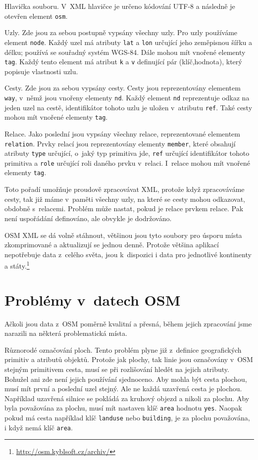 {\tuc Hlavička souboru.} V~XML hlavičce je určeno kódování UTF-8 a následně je
otevřen element \verb|osm|. 

{\tuc Uzly.} Zde jsou za sebou postupně vypsány všechny uzly.  Pro uzly
používáme element \verb|node|. Každý uzel má atributy \verb|lat| a \verb|lon|
určující jeho zeměpisnou šířku a délku; používá se souřadný systém
WGS-84. \cite{wgsnorma} Dále mohou mít vnořené elementy \verb|tag|. Každý tento
element má atribut \verb|k| a \verb|v| definující pár (klíč,hodnota), který
popisuje vlastnosti uzlu.

{\tuc Cesty.} Zde jsou za sebou vypsány cesty. Cesty jsou reprezentovány
elementem \verb|way|, v~němž jsou vnořeny elementy \verb|nd|. Každý element
\verb|nd| reprezentuje odkaz na jeden uzel na cestě, identifikátor tohoto uzlu
je uložen v~atributu \verb|ref|. Také cesty mohou mít vnořené elementy
\verb|tag|.

{\tuc Relace.} Jako poslední jsou vypsány všechny relace, reprezentované
elementem \verb|relation|. Prvky relací jsou reprezentovány elementy
\verb|member|, které obsahují atributy \verb|type| určující, o~jaký typ
primitiva jde, \verb|ref| určující identifikátor tohoto primitiva a \verb|role|
určující roli daného prvku v~relaci. I~relace mohou mít vnořené elementy
\verb|tag|.

Toto pořadí umožňuje proudově zpracovávat XML, protože když zpracováváme cesty,
tak již máme v~paměti všechny uzly, na které se cesty mohou odkazovat, obdobně
s~relacemi. Problém může nastat, pokud je relace prvkem relace. Pak není
uspořádání definováno, ale obvykle je dodržováno. 

OSM XML se dá volně stáhnout, většinou jsou tyto soubory pro úsporu místa
zkomprimované a aktualizují se jednou denně. Protože většina aplikací
nepotřebuje data z~celého světa, jsou k~dispozici i data pro jednotlivé
kontinenty a státy.\footnote{\url{http://osm.kyblsoft.cz/archiv/}}

\section{Problémy v~datech OSM}
Ačkoli jsou data z~OSM poměrně kvalitní a přesná, během jejich zpracování jsme
narazili na některá problematická místa. 

{\tuc Různorodé označování ploch.} Tento problém plyne již z~definice geografických
primitiv a atributů objektů. Protože jak plochy, tak linie jsou označovány v~OSM
stejným primitivem cesta, musí se při rozlišování hledět na jejich atributy.
Bohužel ani zde není jejich používání sjednoceno. Aby mohla být cesta
plochou, musí mít první a poslední uzel stejný. Ale ne každá uzavřená 
cesta je plochou. Například uzavřená silnice se pokládá za kruhový objezd a
nikoli za plochu. Aby byla považována za plochu, musí mít nastaven klíč
\verb|area| hodnotu \verb|yes|. Naopak pokud má cesta například klíč \verb|landuse|
nebo \verb|building|, je za plochu považována, i když nemá klíč \verb|area|.


